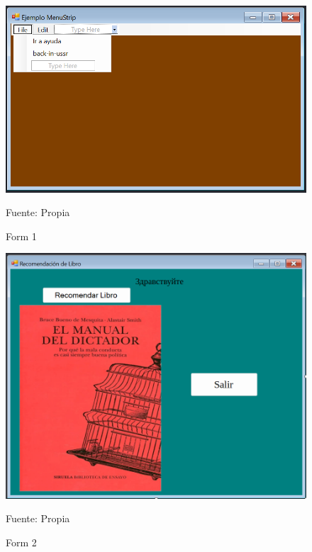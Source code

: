 \begin{figure}[H]
  \centering
  \includegraphics[scale = 0.5]{Imagenes/ui_1.png}
  \caption{Form 1}{Fuente: Propia}
\end{figure}

\begin{figure}[htb]
  \centering
  \includegraphics[scale = 0.4]{Imagenes/ui_2.png}
  \caption{Form 2}{Fuente: Propia}
\end{figure}